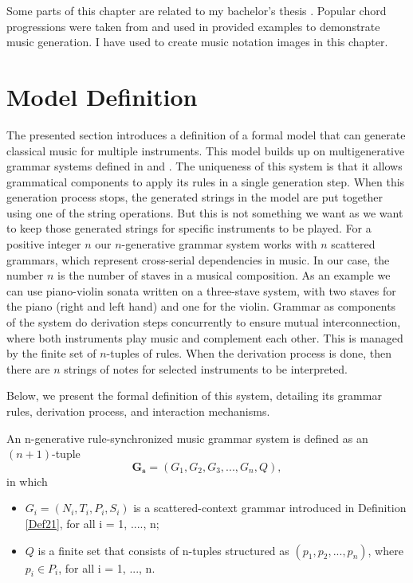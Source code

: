 Some parts of this chapter are related to my bachelor's thesis \cite{jozef}. Popular chord progressions were taken from \cite{justinguitar_chord_progressions} and used in provided examples to demonstrate music generation. I have used \cite{noteflight} to create music notation images in this chapter.

\section{Model Definition}
The presented section introduces a definition of a formal model that can generate classical music for multiple instruments. This model builds up on multigenerative grammar systems defined in \cite{LanguageTheory} and \cite{Lukas2006}. The uniqueness of this system is that it allows grammatical components to apply its rules in a single generation step. When this generation process stops, the generated strings in the model are put together using one of the string operations. But this is not something we want as we want to keep those generated strings for specific instruments to be played. For a positive integer $n$ our $n$-generative grammar system works with $n$ scattered grammars, which represent cross-serial dependencies in music. In our case, the number $n$ is the number of staves in a musical composition. As an example we can use piano-violin sonata written on a three-stave system, with two staves for the piano (right and left hand) and one for the violin. Grammar as components of the system do derivation steps concurrently to ensure mutual interconnection, where both instruments play music and complement each other. This is managed by the finite set of $n$-tuples of rules. When the derivation process is done, then there are $n$ strings of notes for selected instruments to be interpreted.

Below, we present the formal definition of this system, detailing its grammar rules, derivation process, and interaction mechanisms.

\begin{definition}
\label{Defnmgr}
An n-generative rule-synchronized music grammar system is defined as an $(n+1)$-tuple $$\mathbf{G_s} = (G_1, G_2, G_3, ..., G_n, Q),$$ in which

\begin{itemize}
    \item{$G_i = (N_i, T_i, P_i, S_i)$ is a scattered-context grammar introduced in Definition \ref{Def21}, for all i = 1, ...., n;}
    \item{$Q$ is a finite set that consists of n-tuples structured as $(p_1, p_2, ..., p_n)$, where $p_i \in P_i$, for all i = 1, ..., n.}
\end{itemize}
\end{definition}

